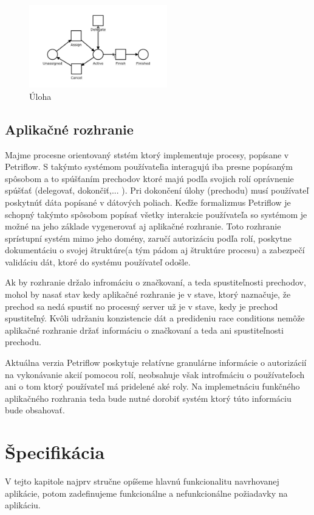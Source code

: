 \begin{figure}[!htbp]
 	\centering
 	\includegraphics[width=6cm]{img/task_transition.png}
 	\caption{Úloha}
 	\label{task}
\end{figure} 


  

\subsection{Aplikačné rozhranie} 

Majme procesne orientovaný ststém ktorý implementuje procesy, popísane v Petriflow. S takýmto systémom používateľia interagujú iba presne popísaným spôsobom a to spúšťaním prechodov ktoré majú podľa svojich rolí oprávnenie spúšťať (delegovať, dokončiť,... ). Pri dokončení úlohy (prechodu) musí používateľ poskytnúť dáta popísané v dátových poliach. 
Keďže formalizmus Petriflow je schopný takýmto spôsobom popísať všetky interakcie používateľa so systémom je možné na jeho základe vygenerovať aj aplikačné rozhranie. Toto rozhranie sprístupní systém mimo jeho domény, zaručí autorizáciu podľa rolí, poskytne dokumentáciu o svojej štruktúre(a tým pádom aj štruktúre procesu) a zabezpečí validáciu dát, ktoré do systému používateľ odošle.

Ak by rozhranie držalo infromáciu o značkovaní, a teda spustiteľnosti prechodov, mohol by nasať stav kedy aplikačné rozhranie je v stave, ktorý naznačuje, že prechod sa nedá spustiť no procesný server už je v stave, kedy je prechod spustiteľný. Kvôli udržaniu konzistencie dát a predideniu race conditions nemôže aplikačné rozhranie držať informáciu o značkovaní a teda ani spustiteľnosti prechodu.

Aktuálna verzia Petriflow poskytuje relatívne granulárne informácie o autorizácií na vykonávanie akcií pomocou rolí, neobsahuje však introfmáciu o používateľoch ani o tom ktorý používateľ má pridelené aké roly. Na implemetnáciu funkčného aplikačného rozhrania teda bude nutné dorobiť systém ktorý túto informáciu bude obsahovať. 

  
\section{Špecifikácia} 
V tejto kapitole najprv stručne opíšeme hlavnú funkcionalitu navrhovanej aplikácie, potom zadefinujeme funkcionálne a nefunkcionálne požiadavky na aplikáciu. 

